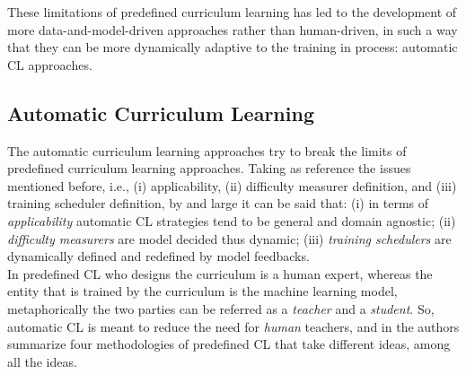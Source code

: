 These limitations of predefined curriculum learning has led to the development 
of more data-and-model-driven approaches rather than human-driven, in such a way 
that they can be more dynamically adaptive to the training in process: automatic 
CL approaches.

\subsection{Automatic Curriculum Learning}
The automatic curriculum learning approaches try to break the limits of predefined curriculum learning approaches.
Taking as reference the issues mentioned before, i.e., (i) applicability, (ii) difficulty measurer definition, and (iii) training scheduler definition, 
by and large it can be said that: (i) in terms of \textit{applicability} automatic CL strategies 
tend to be general and domain agnostic; (ii) \textit{difficulty measurers} are model decided thus dynamic; (iii) \textit{training schedulers}
are dynamically defined and redefined by model feedbacks.\\
In predefined CL who designs the curriculum is a human expert, whereas the entity that is trained
by the curriculum is the machine learning model, metaphorically the two parties can be referred as 
a \textit{teacher} and a \textit{student}. So, automatic CL is meant
to reduce the need for \textit{human} teachers, and in \cite{wang2021survey} the authors summarize 
four methodologies of predefined CL that take different ideas, among all the ideas.

